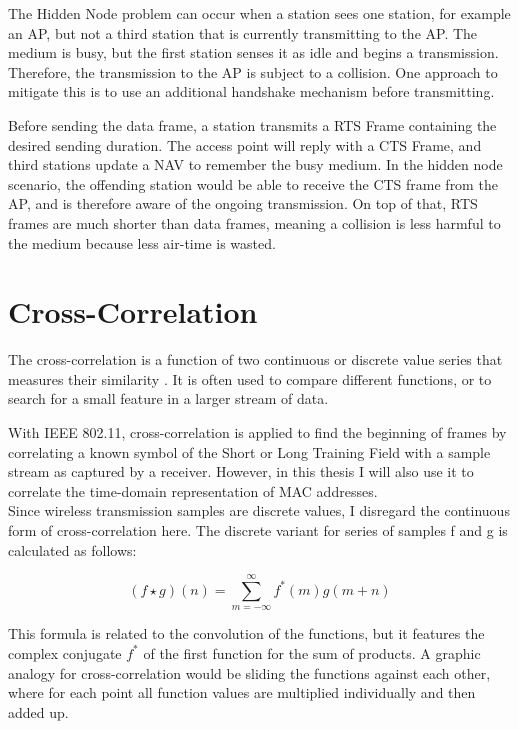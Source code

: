 The Hidden Node problem can occur when a station sees one station, for example an \gls{AP}, but not a third station that is currently transmitting to the \gls{AP}. The medium is busy, but the first station senses it as idle and begins a transmission. Therefore, the transmission to the \gls{AP} is subject to a collision. One approach to mitigate this is to use an additional handshake mechanism before transmitting.

Before sending the data frame, a station transmits a \gls{RTS} Frame containing the desired sending duration. The access point will reply with a \gls{CTS} Frame, and third stations update a \gls{NAV} to remember the busy medium. In the hidden node scenario, the offending station would be able to receive the \gls{CTS} frame from the \gls{AP}, and is therefore aware of the ongoing transmission. On top of that, \gls{RTS} frames are much shorter than data frames, meaning a collision is less harmful to the medium because less air-time is wasted.



\section{Cross-Correlation}

The cross-correlation is a function of two continuous or discrete value series that measures their similarity \cite{rabiner1978}. It is often used to compare different functions, or to search for a small feature in a larger stream of data.

With \gls{IEEE} 802.11, cross-correlation is applied to find the beginning of frames by correlating a known symbol of the Short or Long Training Field with a sample stream as captured by a receiver. However, in this thesis I will also use it to correlate the time-domain representation of \gls{MAC} addresses.\\

Since wireless transmission samples are discrete values, I disregard the continuous form of cross-correlation here. The discrete variant for series of samples f and g is calculated as follows:

$$ (f \star g)(n) = \sum_{m=-\infty}^{\infty} f^{\ast}(m) g(m+n) $$\vspace{0cm}

This formula is related to the convolution of the functions, but it features the complex conjugate $ f^{\ast} $ of the first function for the sum of products. A graphic analogy for cross-correlation would be sliding the functions against each other, where for each point all function values are multiplied individually and then added up.

